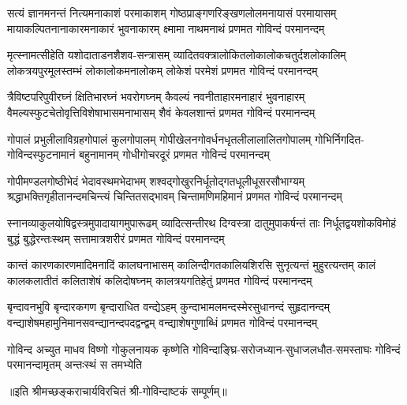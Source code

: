 
\fourlineindentedshloka
{सत्यं ज्ञानमनन्तं नित्यमनाकाशं परमाकाशम्}
{गोष्ठप्राङ्गणरिङ्खणलोलमनायासं परमायासम्}
{मायाकल्पितनानाकारमनाकारं भुवनाकारम्}
{क्ष्मामा नाथमनाथं प्रणमत गोविन्दं परमानन्दम्}

\fourlineindentedshloka
{मृत्स्नामत्सीहेति यशोदाताडनशैशव-सन्त्रासम्}
{व्यादितवक्त्रालोकितलोकालोकचतुर्दशलोकालिम्}
{लोकत्रयपुरमूलस्तम्भं लोकालोकमनालोकम्}
{लोकेशं परमेशं प्रणमत गोविन्दं परमानन्दम्}

\fourlineindentedshloka
{त्रैविष्टपरिपुवीरघ्नं क्षितिभारघ्नं भवरोगघ्नम्}
{कैवल्यं नवनीताहारमनाहारं भुवनाहारम्}
{वैमल्यस्फुटचेतोवृत्तिविशेषाभासमनाभासम्}
{शैवं केवलशान्तं प्रणमत गोविन्दं परमानन्दम्}

\fourlineindentedshloka
{गोपालं प्रभुलीलाविग्रहगोपालं कुलगोपालम्}
{गोपीखेलनगोवर्धनधृतलीलालालितगोपालम्}
{गोभिर्निगदित-गोविन्दस्फुटनामानं बहुनामानम्}
{गोधीगोचरदूरं प्रणमत गोविन्दं परमानन्दम्}

\fourlineindentedshloka
{गोपीमण्डलगोष्ठीभेदं भेदावस्थमभेदाभम्}
{शश्वद्गोखुरनिर्धूतोद्गतधूलीधूसरसौभाग्यम्}
{श्रद्धाभक्तिगृहीतानन्दमचिन्त्यं चिन्तितसद्भावम्}
{चिन्तामणिमहिमानं प्रणमत गोविन्दं परमानन्दम्}

\fourlineindentedshloka
{स्नानव्याकुलयोषिद्वस्त्रमुपादायागमुपारूढम्}
{व्यादित्सन्तीरथ दिग्वस्त्रा दातुमुपाकर्षन्तं ताः}
{निर्धूतद्वयशोकविमोहं बुद्धं बुद्धेरन्तःस्थम्}
{सत्तामात्रशरीरं प्रणमत गोविन्दं परमानन्दम्}

\fourlineindentedshloka
{कान्तं कारणकारणमादिमनादिं कालघनाभासम्}
{कालिन्दीगतकालियशिरसि सुनृत्यन्तं मुहुरत्यन्तम्}
{कालं कालकलातीतं कलिताशेषं कलिदोषघ्नम्}
{कालत्रयगतिहेतुं प्रणमत गोविन्दं परमानन्दम्}

\fourlineindentedshloka
{बृन्दावनभुवि बृन्दारकगण बृन्दाराधित वन्द्येऽहम्}
{कुन्दाभामलमन्दस्मेरसुधानन्दं सुहृदानन्दम्}
{वन्द्याशेषमहामुनिमानसवन्द्यानन्दपदद्वन्द्वम्}
{वन्द्याशेषगुणाब्धिं प्रणमत गोविन्दं परमानन्दम्}

{गोविन्द अच्युत माधव विष्णो गोकुलनायक कृष्णेति}
{गोविन्दाङ्घ्रि-सरोजध्यान-सुधाजलधौत-समस्ताघः}
{गोविन्दं परमानन्दामृतम् अन्तःस्थं स तमभ्येति}

॥इति श्रीमच्छङ्कराचार्यविरचितं श्री-गोविन्दाष्टकं सम्पूर्णम्॥